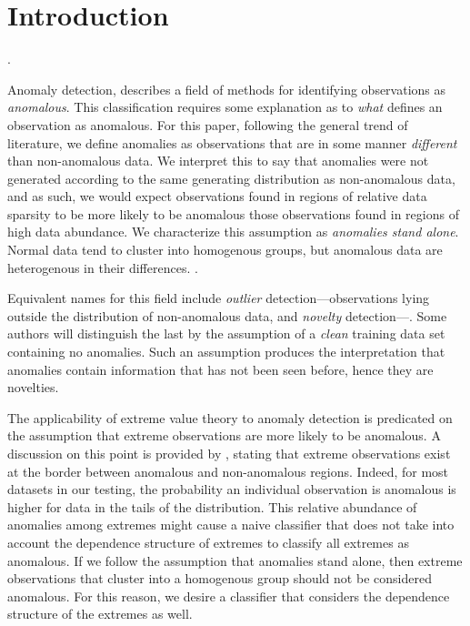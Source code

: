 \section{Introduction}


.

Anomaly detection, describes a field of methods for identifying observations as 
    \emph{anomalous}. This classification requires some explanation as to 
    \emph{what} defines an observation as anomalous. For this paper, following 
    the general trend of literature, we define anomalies as observations that 
    are in some manner \emph{different} than non-anomalous data. We interpret 
    this to say that anomalies were not generated according to the same generating 
    distribution as non-anomalous data, and as such, we would expect observations 
    found in regions of relative data sparsity to be more likely to be anomalous 
    those observations found in regions of high data abundance.  We characterize 
    this assumption as \emph{anomalies stand alone}.  Normal data tend to cluster 
    into homogenous groups, but anomalous data are heterogenous in their differences.
    .

    Equivalent names for this field include \emph{outlier} detection---observations lying outside the
    distribution of non-anomalous data, and \emph{novelty} detection---.  Some authors will
    distinguish the last by the assumption of a \emph{clean} training data set containing no anomalies.  Such
    an assumption produces the interpretation that anomalies contain information that has not been seen before,
    hence they are novelties.

The applicability of extreme value theory to anomaly detection is predicated on the assumption that
  extreme observations are more likely to be anomalous.  A discussion on this point is provided by \cite{goix2017},
  stating that extreme observations exist at the border between anomalous and non-anomalous regions.  Indeed,
  for most datasets in our testing, the probability an individual observation is anomalous is higher
  for data in the tails of the distribution. This relative abundance of anomalies among extremes might 
  cause a naive classifier that does not take into account the dependence structure of extremes to 
  classify all extremes as anomalous.  If we follow the assumption that anomalies stand alone, then extreme
  observations that cluster into a homogenous group should not be considered anomalous.  For this reason, we
  desire a classifier that considers the dependence structure of the extremes as well.

